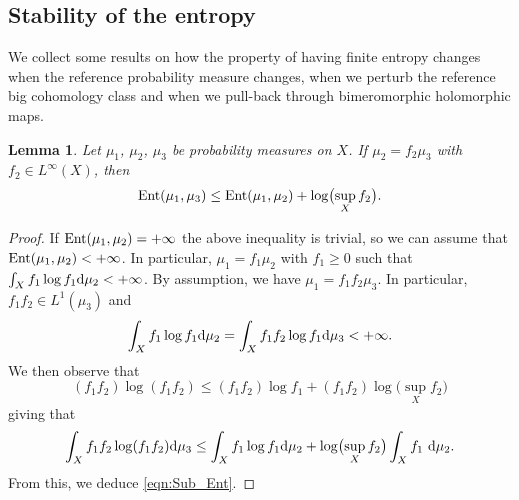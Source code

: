 \documentclass[pdftex]{sigma}
\numberwithin{equation}{section}
\newtheorem{Lemma}[Theorem]{Lemma}
\theoremstyle{plain}
\newcommand \Ent{{\rm Ent}}
\begin{document}
\subsection{Stability of the entropy}
We collect some results on how the property of having finite entropy changes when the reference probability measure changes, when we perturb the reference big cohomology class and when we pull-back through bimeromorphic holomorphic maps.

 \begin{Lemma}
 \label{lem:Sub_Ent}
 Let $\mu_1$, $\mu_2$, $\mu_3$ be probability measures on $X$. If $\mu_2=f_2 \mu_3$ with $f_2\in L^\infty(X)$, then
 \begin{gather} \label{eqn:Sub_Ent}
 \Ent(\mu_1,\mu_3)\leq\Ent(\mu_1,\mu_2)+\log\bigl(\sup_{X}f_2\bigr).
 \end{gather}
 \end{Lemma}
 \begin{proof}
If $\Ent(\mu_1,\mu_2)=+\infty$ the above inequality is trivial, so we can assume that $\Ent(\mu_1,\mu_2)<+\infty$. In particular, $\mu_1= f_1\mu_2$ with $f_1\geq 0$ such that $\int_X f_1 \log f_1 {\rm d}\mu_2<+\infty$. By assumption, we have $\mu_1=f_1f_2 \mu_3$. In particular, $f_1f_2\in L^1(\mu_3)$ and
\[ \int_X f_1 \log f_1 {\rm d}\mu_2= \int_X f_1 f_2 \log f_1 {\rm d}\mu_3 <+\infty.
 \]
 We then observe that
 \[
 (f_1f_2) \log(f_1f_2)\leq (f_1 f_2)\log f_1 + (f_1f_2)\log \bigl(\sup_X f_2\bigr)
 \]
 giving that
 \[\int_X f_1 f_2 \log (f_1 f_2) {\rm d}\mu_3 \leq \int_X f_1 \log f_1 {\rm d}\mu_2+ \log \bigl(\sup_X f_2\bigr) \int_X f_1 \ {\rm d}\mu_2. \]
 From this, we deduce \eqref{eqn:Sub_Ent}.
 \end{proof}
\end{document}
